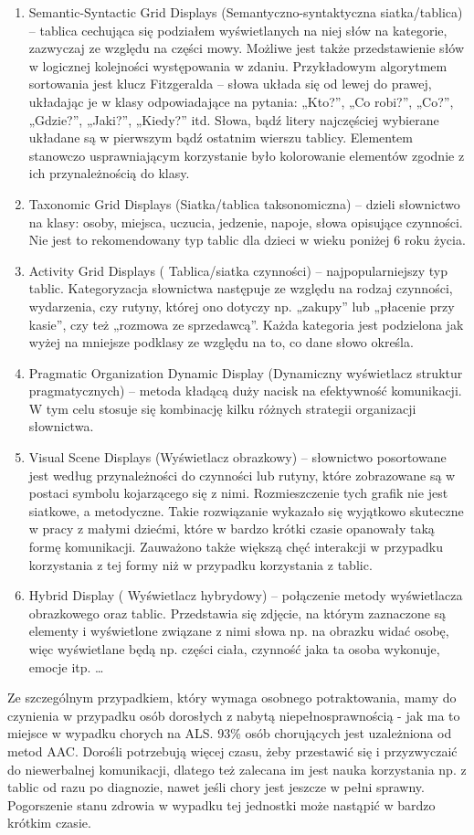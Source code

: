 \documentclass[twoside,a4paper]{book}
\begin{document}
\begin{enumerate}
\item Semantic-Syntactic Grid Displays (Semantyczno-syntaktyczna siatka/tablica) – tablica cechująca się podziałem wyświetlanych na niej słów na kategorie, zazwyczaj ze względu na części mowy. Możliwe jest także przedstawienie słów w logicznej kolejności występowania w zdaniu. Przykładowym algorytmem sortowania jest klucz Fitzgeralda – słowa układa się od lewej do prawej, układając je w klasy odpowiadające na pytania: „Kto?”, „Co robi?”, „Co?”, „Gdzie?”, „Jaki?”, „Kiedy?” itd.  Słowa, bądź litery naj\-częś\-ciej wybierane układane są w pierwszym bądź ostatnim wierszu ta\-bli\-cy. Elementem stanowczo usprawniającym korzystanie było kolorowanie elementów zgodnie z ich przynależnością do  klasy. 
\item Taxonomic Grid Displays (Siatka/tablica taksonomiczna) – dzieli sło\-wni\-ctwo na klasy: osoby, miejsca, uczucia, jedzenie, napoje, słowa opisujące czynności. Nie jest to rekomendowany typ tablic dla dzieci w wieku poniżej 6 roku życia. 
\item Activity Grid Displays ( Tablica/siatka czynności) – najpopularniejszy typ tablic. Kategoryzacja słownictwa następuje ze względu na rodzaj czynności, wydarzenia, czy rutyny, której ono dotyczy np. „zakupy” lub „płacenie przy kasie”, czy też „rozmowa ze sprzedawcą”. Każda kategoria jest podzielona jak wyżej na mniejsze podklasy ze względu na to, co dane słowo określa. 
\item Pragmatic Organization Dynamic Display (Dynamiczny wy\-świe\-tlacz  struktur pragmatycznych) – metoda kładącą duży nacisk na efektywność komunikacji. W tym celu stosuje się kombinację kilku różnych strategii organizacji słownictwa. 
\item Visual Scene Displays (Wyświetlacz obrazkowy) – słownictwo posortowane jest według przynależności do czynności lub rutyny, które zobrazowane są w postaci  symbolu kojarzącego się z nimi. Rozmieszczenie tych grafik nie jest siatkowe, a metodyczne. Takie rozwiązanie wykazało się wyjątkowo skuteczne w pracy z małymi dziećmi, które w bardzo krótki czasie opanowały taką formę komunikacji.  Zauważono także większą chęć interakcji w przypadku korzystania z tej formy niż w przypadku korzystania z tablic. 
\item Hybrid Display ( Wyświetlacz hybrydowy) – połączenie metody wyś\-wie\-tla\-cza obrazkowego oraz tablic. Przedstawia się zdjęcie,  na którym zaznaczone są elementy i wyświetlone związane z nimi słowa np. na obrazku widać osobę, więc wyświetlane będą np. części ciała, czynność jaka ta osoba wykonuje, emocje itp. 
 \ldots
\end{enumerate}
Ze szczególnym przypadkiem, który wymaga osobnego potraktowania, mamy do czynienia w przypadku osób dorosłych z nabytą niepełnosprawnością - jak ma to miejsce w wypadku chorych na ALS. 93\% osób chorujących jest uzależniona od metod AAC. Dorośli potrzebują więcej czasu, żeby przestawić się i przyzwyczaić do niewerbalnej komunikacji, dlatego też zalecana im jest nauka korzystania np. z tablic od razu po diagnozie, nawet jeśli chory jest jeszcze w pełni sprawny. Pogorszenie stanu zdrowia w wypadku tej jednostki może nastąpić w bardzo krótkim czasie.   
\end{document}
